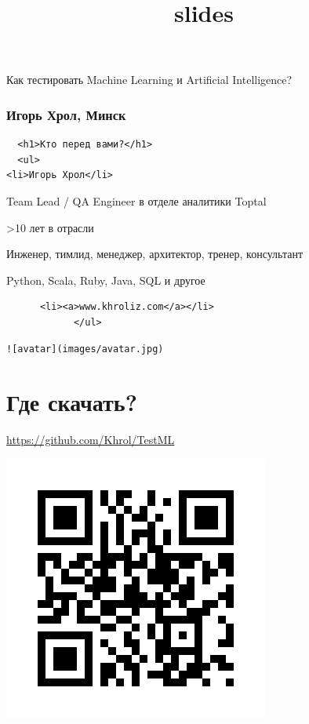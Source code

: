 \documentclass[11pt]{article}
\title{slides}
\makeatletter
\def\maxwidth{\ifdim\Gin@nat@width>\linewidth\linewidth
    \else\Gin@nat@width\fi}
\let\Oldincludegraphics\includegraphics
\renewcommand{\includegraphics}[1]{\Oldincludegraphics[width=.8\maxwidth]{#1}}
\makeatother
\begin{document}
    
    
    \maketitle
    
    

    
    Как тестировать Machine Learning и Artificial Intelligence?

\hypertarget{ux438ux433ux43eux440ux44c-ux445ux440ux43eux43b-ux43cux438ux43dux441ux43a}{%
\subsubsection{Игорь Хрол,
Минск}\label{ux438ux433ux43eux440ux44c-ux445ux440ux43eux43b-ux43cux438ux43dux441ux43a}}

    \begin{verbatim}
  <h1>Кто перед вами?</h1>
  <ul>
<li>Игорь Хрол</li>
\end{verbatim}

Team Lead / QA Engineer в отделе аналитики Toptal

\textgreater{}10 лет в отрасли

Инженер, тимлид, менеджер, архитектор, тренер, консультант

Python, Scala, Ruby, Java, SQL и другое

\begin{verbatim}
      <li><a>www.khroliz.com</a></li>
            </ul>
\end{verbatim}

\begin{verbatim}
![avatar](images/avatar.jpg)
\end{verbatim}

    \hypertarget{ux433ux434ux435-ux441ux43aux430ux447ux430ux442ux44c}{%
\section{Где
скачать?}\label{ux433ux434ux435-ux441ux43aux430ux447ux430ux442ux44c}}

\url{https://github.com/Khrol/TestML}

\includegraphics{images/repo_qr.jpg}\\
\end{document}
